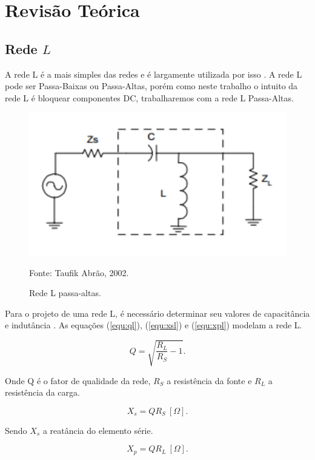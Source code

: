 \newpage
\section{Revisão Teórica}
\subsection{Rede $L$}\label{subsec:l}
A rede L é a mais simples das redes e é largamente utilizada por isso \cite{Couch}. A rede L pode ser Passa-Baixas ou Passa-Altas, porém como neste trabalho o intuito da rede L é bloquear componentes DC, trabalharemos com a rede L Passa-Altas.

\begin{figure}[H]
    \centering
    \caption{Rede L passa-altas.}
    \includegraphics[scale=0.3]{Imagens/fig1.png}
    \label{f_fig1}
    
    \small Fonte: Taufik Abrão, 2002.
\end{figure}

Para o projeto de uma rede L, é necessário determinar seu valores de capacitância e indutância \cite{abrao, taufik1}. As equações (\ref{equ:ql}), (\ref{equ:xsl}) e (\ref{equ:xpl}) modelam a rede L. 

\begin{equation}
Q = \sqrt{\frac{R_L}{R_S}-1}.
\label{equ:ql}
\end{equation}

Onde Q é o fator de qualidade da rede, $R_S$ a resistência da fonte e $R_L$ a resistência da carga.

\begin{equation}
X_s = QR_S \ [\Omega].
\label{equ:xsl}
\end{equation}

Sendo $X_s$ a reatância do elemento série.

\begin{equation}
X_p = QR_L \ [\Omega].
\label{equ:xpl}
\end{equation}

